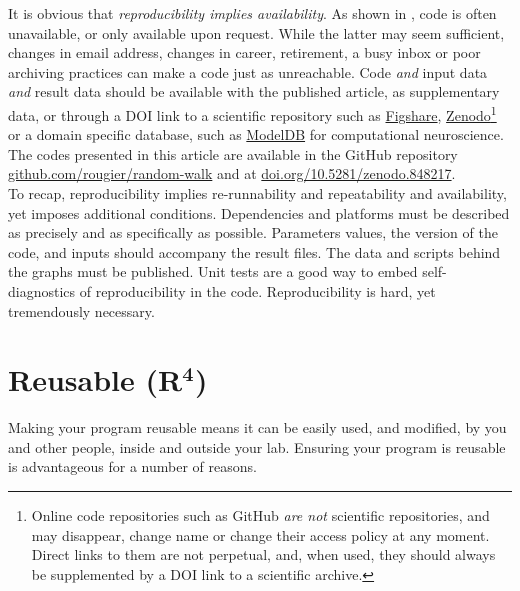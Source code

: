 \documentclass[a4paper,11pt]{article}
\begin{document}
It is obvious that \emph{reproducibility implies availability}. As shown in \citep{Collberg:2016}, code is often unavailable, or only available upon request. While the latter may seem sufficient, changes in email address, changes in career, retirement, a busy inbox or poor archiving practices can make a code just as unreachable. Code \emph{and} input data \emph{and} result data should be available with the published article, as supplementary data, or through a DOI link to a scientific repository such as \href{https://figshare.com}{Figshare}, \href{https://zenodo.org}{Zenodo}\footnote{Online code repositories such as GitHub \emph{are not} scientific repositories, and may disappear, change name or change their access policy at any moment. Direct links to them are not perpetual, and, when used, they should always be supplemented by a DOI link to a scientific archive.} or a domain specific database, such as \href{https://senselab.med.yale.edu/modeldb/}{ModelDB} for computational neuroscience. The codes presented in this article are available in the GitHub repository \href{https://github.com/rougier/random-walk}{github.com/rougier/random-walk} and at \href{https://doi.org/10.5281/zenodo.848217}{doi.org/10.5281/zenodo.848217}.\\

To recap, reproducibility implies re-runnability and repeatability and availability, yet imposes additional conditions. Dependencies and platforms must be described as precisely and as specifically as possible. Parameters values, the version of the code, and inputs should accompany the result files. The data and scripts behind the graphs must be published. Unit tests are a good way to embed self-diagnostics of reproducibility in the code. Reproducibility is hard, yet tremendously necessary.


\section*{Reusable (R$^{\mathbf 4}$)}

Making your program reusable means it can be easily used, and modified, by you and other people, inside and outside your lab. Ensuring your program is reusable is advantageous for a number of reasons.\\
\end{document}

